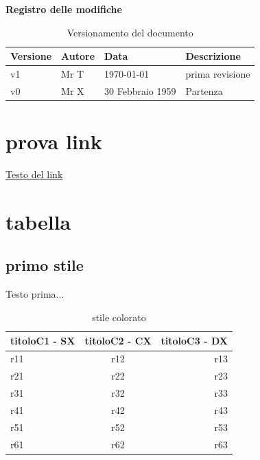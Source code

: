 \documentclass[12pt,a4paper]{article}
\begin{document}
\Large{\textbf{Registro delle modifiche}}
\normalsize

\begin{table}[h]
\begin{center}

\begin{tabular}{p{} p{} p{} p{}}
\toprule
\textbf{Versione}	&	\textbf{Autore}	&	\textbf{Data}	&	\textbf{Descrizione}\\
\midrule
\midrule
v1	&	Mr T	&	\today 	&	prima revisione\\
\midrule
v0	&	Mr X	&	30 Febbraio 1959	&	Partenza\\
\bottomrule
\end{tabular}
\caption{Versionamento del documento}
\label{tabVers1}
\end{center}
\end{table}
\newpage

\tableofcontents
\newpage

\listoftables
\listoffigures
\newpage


\section{prova link}
\href{http://docs.oracle.com/javase/tutorial/}{Testo del link}
\newpage

\section{tabella}
\subsection{primo stile}
Testo prima...
\begin{table}[h]
\begin{center}
\begin{tabular}{lcr}
\toprule
titoloC1 - SX	&	titoloC2 - CX	&	titoloC3 - DX\\
\midrule
\midrule
r11	& r12 & r13\\
r21	& r22 & r23\\
r31 & r32 & r33\\
r41 & r42 & r43\\
r51 & r52 & r53\\
\midrule
r61 & r62 & r63\\
\bottomrule
\end{tabular}
\end{center}

\caption{stile colorato}
\label{t1}
\end{table}
\end{document}
